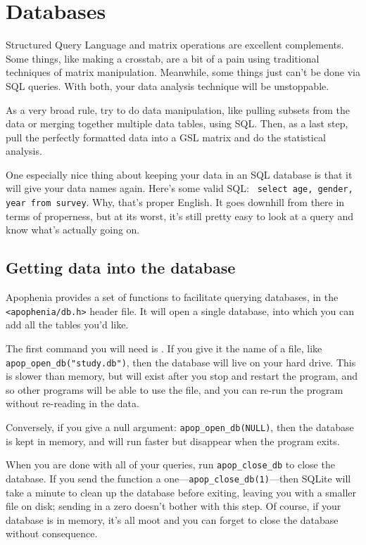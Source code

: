 \chapter{Databases} \label{sql}

Structured Query Language and matrix operations are excellent complements. Some things, like
making a crosstab, are a bit of a pain using traditional techniques of
matrix manipulation. Meanwhile, some things just can't be done via SQL
queries. With both, your data analysis technique will be unstoppable.

As a very broad rule, try to do data manipulation, like pulling subsets
from the data or merging together multiple data tables, using SQL. Then,
as a last step, pull the perfectly formatted data into a GSL matrix and
do the statistical analysis. 

One especially nice thing about keeping your data in an SQL database
is that it will give your data names again. Here's some valid SQL: {\tt
select age, gender, year from survey}. Why, that's proper English. It
goes downhill from there in terms of properness, but at its worst, it's
still pretty easy to look at a query and know what's actually going on.

\section{Getting data into the database}
Apophenia provides a set of functions to facilitate querying databases,
in the {\tt <apophenia/db.h>} header file. It will open
a single database, into which you can add all the tables you'd like.

The first command you will need is . If you give
it the name of a file, like {\tt apop\_open\_db("study.db")}, then the
database will live on your hard drive. This is slower than memory, but
will exist after you stop and restart the program, and so other programs
will be able to use the file, and you can re-run the program without
re-reading in the data.

Conversely, if you give a null argument: {\tt apop\_open\_db(NULL)},
then the database is kept in memory, and will run faster but 
disappear when the program exits.

When you are done with all of your queries, run
{\tt apop\_close\_db} to close the database. If you send the function a
one---{\tt apop\_close\_db(1)}---then SQLite will take a minute to clean
up the database before exiting, leaving you with a smaller file on disk;
sending in a zero doesn't bother with this step. Of course, if your
database is in memory, it's all moot and you can forget to close the
database without consequence.

